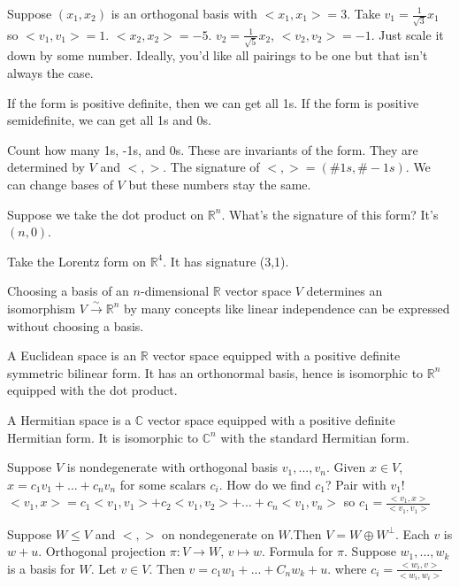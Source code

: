 \documentclass{article}
\newcommand{\C}{\mathbb{C}}
\newcommand{\R}{\mathbb{R}}
\newcommand{\ra}[1][]{\xrightarrow{#1}}
\begin{document}
\begin{example}
Suppose $(x_1,x_2)$ is an orthogonal basis with $<x_1,x_1>=3$. Take $v_1=\frac{1}{\sqrt3}x_1$ so $<v_1,v_1>=1$. $<x_2,x_2>=-5$. $v_2=\frac{1}{\sqrt5}x_2$, $<v_2,v_2>=-1$. Just scale it down by some number. Ideally, you'd like all pairings to be one but that isn't always the case.

If the form is positive definite, then we can get all 1s. If the form is positive semidefinite, we can get all 1s and 0s. 
\end{example}
\begin{theorem}
Count how many 1s, -1s, and 0s. These are invariants of the form. They are determined by $V$ and $<,>$. The signature of $<,>=(\#1s,\#-1s)$. We can change bases of $V$ but these numbers stay the same.
\end{theorem}
\begin{example}
Suppose we take the dot product on $\R^n$. What's the signature of this form? It's $(n,0)$. 

Take the Lorentz form on $\R^4$. It has signature (3,1). 
\end{example}
Choosing a basis of an $n$-dimensional $\R$ vector space $V$ determines an isomorphism $V\ra[\sim]\R^n$ by many concepts like linear independence can be expressed without choosing a basis. 
\begin{definition}
A Euclidean space is an $\R$ vector space equipped with a positive definite symmetric bilinear form. It has an orthonormal basis, hence is isomorphic to $\R^n$ equipped with the dot product.
\end{definition}
\begin{definition}
A Hermitian space is a $\C$ vector space equipped with a positive definite Hermitian form. It is isomorphic to $\C^n$ with the standard Hermitian form. 
\end{definition}
Suppose $V$ is nondegenerate with orthogonal basis $v_1,...,v_n$. Given $x\in V$, $x=c_1v_1+...+c_nv_n$ for some scalars $c_i$. How do we find $c_1$? Pair with $v_1$! $<v_1,x>=c_1<v_1,v_1>+c_2<v_1,v_2>+...+c_n<v_1,v_n>$ so $c_1=\frac{<v_1,x>}{<v_1,v_1>}$
\begin{definition}
Suppose $W\leq V$ and $<,>$ on nondegenerate on $W$.Then $V=W\oplus W^\perp$. Each $v$ is $w+u$. Orthogonal projection $\pi:V\ra W$, $v\mapsto w$. Formula for $\pi$. Suppose $w_1,...,w_k$ is a basis for $W$. Let $v\in V$. Then $v=c_1w_1+...+C_nw_k+u$. where $c_i=\frac{<w_i,v>}{<w_i,w_i>}$
\end{definition}
\end{document}
